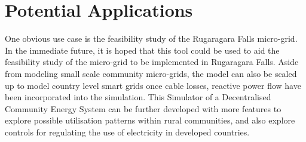\section*{Potential Applications}
One obvious use case is the feasibility study of the Rugaragara Falls micro-grid. In the immediate future, it is hoped that this tool could be used to aid the feasibility study of the micro-grid to be implemented in Rugaragara Falls. Aside from modeling small scale community micro-grids, the model can also be scaled up to model country level smart grids once cable losses, reactive power flow have been incorporated into the simulation. 
This Simulator of a Decentralised Community Energy System can be further developed with more features to explore possible utilisation patterns within rural communities, and also explore controls for regulating the use of electricity in developed countries. 
